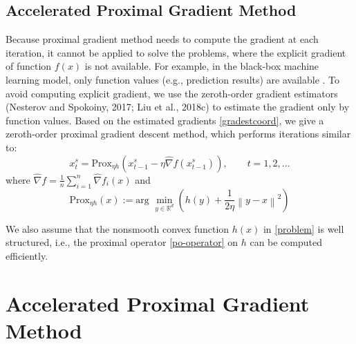 \documentclass{article}
\newcommand*{\R}{\mathbb{R}}
\newcommand*{\Po}{\text{Prox}}
\newcommand{\norm}[1]{\left\lVert#1\right\rVert}
\theoremstyle{definition}
\theoremstyle{remark}
\begin{document}
\subsection{Accelerated Proximal Gradient Method}
{\color{Green}
Because proximal gradient method needs to compute
the gradient at each iteration, it cannot be applied to solve the problems, where the explicit gradient of function $f(x)$ is
not available. For example, in the black-box machine learning model, only function values (e.g., prediction results) are
available \cite{chen2017zoo}. To avoid computing explicit gradient, we use the zeroth-order gradient estimators \cite{nesterov2017random,liu2018zeroth}(Nesterov and Spokoiny, 2017; Liu et al., 2018c) to estimate the
gradient only by function values.
Based on the estimated gradients \eqref{gradestcoord}, we give a zeroth-order proximal gradient descent method, which performs  iterations similar to:
\begin{equation}
x_{t}^s= \Po_{\eta h}(x_{t-1}^s - \eta \hat{\nabla} f(x_{t-1}^s)),\qquad t=1, 2, \ldots
\end{equation}
where $\hat{\nabla} f=\frac{1}{n}\sum_{i=1}^n \hat{\nabla} f_i(x)$ and 
\begin{equation}\label{po-operator}
\Po_{\eta h}(x) := \text{arg}\,\,\min_{y\in\R^d}\left(h(y)+\frac{1}{2\eta}\norm{y-x}^2\right)
\end{equation}
}
{\color{Green}


{\color{Violet}
We also assume that the
nonsmooth convex function $h(x)$ in \eqref{problem} is well structured, i.e., the proximal operator \eqref{po-operator} on $h$ can be computed efficiently.

}
}
\section{Accelerated Proximal Gradient Method}
\end{document}
